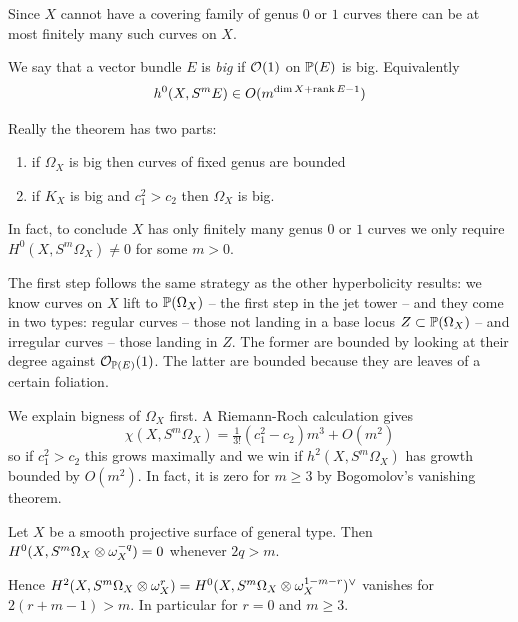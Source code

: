 \documentclass[main.tex]{subfiles}
\begin{document}
\begin{cor}
Since $X$ cannot have a covering family of genus $0$ or $1$ curves there can be at most finitely many such curves on $X$.
\end{cor}

\begin{defn}
We say that a vector bundle $E$ is \textit{big} if $\struct{}(1)$ on $\P(E)$ is big. Equivalently
\[ h^0(X, S^m E) \in O(m^{\dim{X} + \rank{E} - 1}) \]
\end{defn}

Really the theorem has two parts:
\begin{enumerate}
\item if $\Omega_X$ is big then curves of fixed genus are bounded
\item if $K_X$ is big and $c_1^2 > c_2$ then $\Omega_X$ is big.
\end{enumerate}

\begin{rmk}
In fact, to conclude $X$ has only finitely many genus $0$ or $1$ curves we only require $H^0(X, S^m \Omega_X) \neq 0$ for some $m > 0$.
\end{rmk}

The first step follows the same strategy as the other hyperbolicity results: we know curves on $X$ lift to $\P(\Omega_X)$ -- the first step in the jet tower -- and they come in two types: regular curves -- those not landing in a base locus $Z \subset \P(\Omega_X)$ -- and irregular curves -- those landing in $Z$. The former are bounded by looking at their degree against $\struct{\P(E)}(1)$. The latter are bounded because they are leaves of a certain foliation.
\par
We explain bigness of $\Omega_X$ first. A Riemann-Roch calculation gives
\[ \chi(X, S^m \Omega_X) = \tfrac{1}{3!} (c_1^2 - c_2) m^3 + O(m^2) \]
so if $c_1^2 > c_2$ this grows maximally and we win if $h^2(X, S^m \Omega_X)$ has growth bounded by $O(m^2)$. In fact, it is zero for $m \ge 3$ by Bogomolov's vanishing theorem.

\begin{theorem}[Bogomolov]
Let $X$ be a smooth projective surface of general type. Then $H^0(X, S^m \Omega_X \ot \omega_X^{-q}) = 0$ whenever $2q > m$.
\end{theorem}

\begin{rmk}
Hence $H^2(X, S^m \Omega_X \ot \omega_X^r) = H^0(X, S^m \Omega_X \ot \omega_X^{1 - m - r})^{\vee}$ vanishes for $2(r + m - 1) > m$. In particular for $r = 0$ and $m \ge 3$.
\end{rmk}
\end{document}
